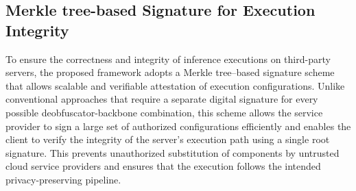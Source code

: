 \documentclass{ieeeaccess}
\begin{document}


\subsection{Merkle tree-based Signature for Execution Integrity}

To ensure the correctness and integrity of inference executions on third-party servers, the proposed framework adopts a Merkle tree--based signature scheme that allows scalable and verifiable attestation of execution configurations. Unlike conventional approaches that require a separate digital signature for every possible deobfuscator-backbone combination, this scheme allows the service provider to sign a large set of authorized configurations efficiently and enables the client to verify the integrity of the server's execution path using a single root signature. This prevents unauthorized substitution of components by untrusted cloud service providers and ensures that the execution follows the intended privacy-preserving pipeline.
\end{document}
